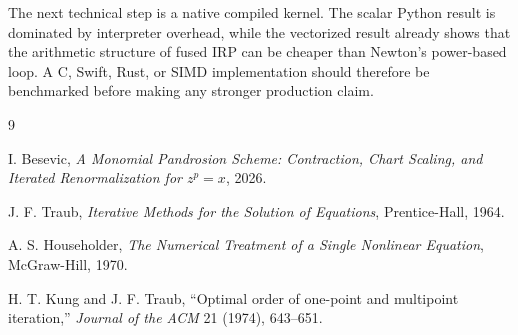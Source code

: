 \documentclass[10pt,a4paper]{article}
\theoremstyle{plain}
\theoremstyle{definition}
\begin{document}
The next technical step is a native compiled kernel.  The scalar Python result
is dominated by interpreter overhead, while the vectorized result already shows
that the arithmetic structure of fused IRP can be cheaper than Newton's
power-based loop.  A C, Swift, Rust, or SIMD implementation should therefore be
benchmarked before making any stronger production claim.

\begin{thebibliography}{9}

I. Besevic,
\emph{A Monomial Pandrosion Scheme: Contraction, Chart Scaling, and Iterated
Renormalization for $z^p=x$}, 2026.

J. F. Traub,
\emph{Iterative Methods for the Solution of Equations},
Prentice-Hall, 1964.

A. S. Householder,
\emph{The Numerical Treatment of a Single Nonlinear Equation},
McGraw-Hill, 1970.

H. T. Kung and J. F. Traub,
``Optimal order of one-point and multipoint iteration,''
\emph{Journal of the ACM} 21 (1974), 643--651.

\end{thebibliography}
\end{document}
